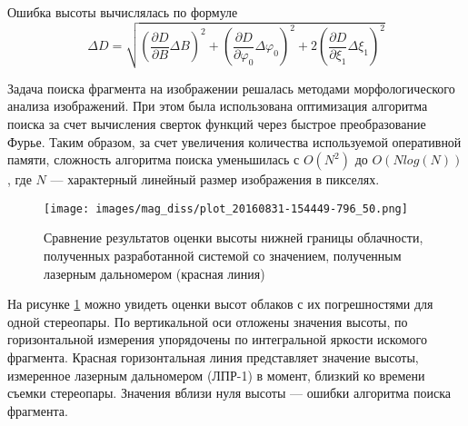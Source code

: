 Ошибка высоты вычислялась по формуле
\begin{equation*}
    \Delta D =  \sqrt{ (\frac{\partial D}{\partial B}\Delta B)^2 + (\frac{\partial D}{\partial \varphi_0}\Delta \varphi_0)^2 + 2(\frac{\partial D}{\partial \xi_1}\Delta \xi_1)^2}
\end{equation*}

Задача поиска фрагмента на изображении решалась методами морфологического анализа изображений. При этом была использована оптимизация алгоритма поиска за счет вычисления сверток функций через быстрое преобразование Фурье. Таким образом, за счет увеличения количества используемой оперативной памяти, сложность алгоритма поиска уменьшилась с $O(N^2)$ до $O(N log(N))$, где $N$ --- характерный линейный размер изображения в пикселях.

\begin{figure}[H]
  \centering
  \texttt{[image: images/mag\_diss/plot\_20160831-154449-796\_50.png]}
  \caption{Сравнение результатов оценки высоты нижней границы облачности,
  полученных разработанной системой со значением, полученным лазерным
  дальномером (красная линия)}
  \label{fig:laser_cloud_height}
\end{figure}

На рисунке \ref{fig:laser_cloud_height} можно увидеть оценки высот облаков с их погрешностями для одной стереопары.
По вертикальной оси отложены значения высоты, по горизонтальной измерения упорядочены по интегральной яркости искомого фрагмента.
Красная горизонтальная линия представляет значение высоты, измеренное лазерным дальномером (ЛПР-1) в момент, близкий ко времени съемки стереопары.
Значения вблизи нуля высоты --- ошибки алгоритма поиска фрагмента.

